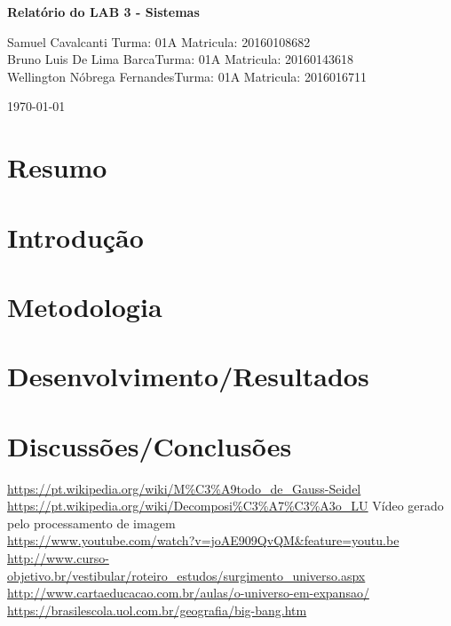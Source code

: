 \documentclass[a4paper, 11pt]{article}
\begin{document}
\begin{center}
\noindent
\large\textbf{Relatório do LAB 3 - Sistemas} \\
\end{center}
Samuel Cavalcanti \hfill Turma: 01A Matricula: 20160108682 \\ 
Bruno Luis De Lima Barca\hfill Turma: 01A Matricula: 20160143618\\
Wellington Nóbrega Fernandes\hfill Turma: 01A Matricula: 2016016711\hspace{0.2cm}  \\

\begin{center}
\today
\end{center}  
\section*{Resumo}
\lipsum[2]

\section*{Introdução}
\lipsum[2]
\section*{Metodologia}
\lipsum[2]


\section*{Desenvolvimento/Resultados}

\lipsum[2]

\lipsum[2]


\section*{Discussões/Conclusões}
\lipsum[2]



\begin{thebibliography}{9}
 \url{https://pt.wikipedia.org/wiki/M%C3%A9todo_de_Gauss-Seidel}
 \url{https://pt.wikipedia.org/wiki/Decomposi%C3%A7%C3%A3o_LU}
 Vídeo gerado pelo processamento de imagem\\
\url{https://www.youtube.com/watch?v=joAE909QvQM&feature=youtu.be}
\url{http://www.curso-objetivo.br/vestibular/roteiro_estudos/surgimento_universo.aspx}
\url{http://www.cartaeducacao.com.br/aulas/o-universo-em-expansao/}
\url{https://brasilescola.uol.com.br/geografia/big-bang.htm}

\end{thebibliography}
\end{document}
